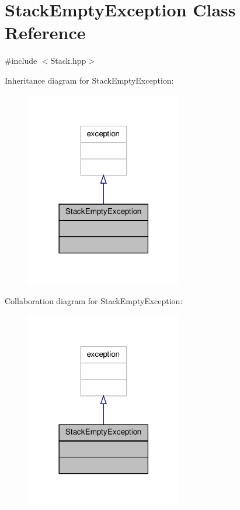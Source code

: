 \hypertarget{class_stack_empty_exception}{\section{Stack\-Empty\-Exception Class Reference}
\label{class_stack_empty_exception}
}


{\ttfamily \#include $<$Stack.\-hpp$>$}



Inheritance diagram for Stack\-Empty\-Exception\-:
\nopagebreak
\begin{figure}[H]
\begin{center}
\leavevmode
\includegraphics[width=194pt]{class_stack_empty_exception__inherit__graph}
\end{center}
\end{figure}


Collaboration diagram for Stack\-Empty\-Exception\-:
\nopagebreak
\begin{figure}[H]
\begin{center}
\leavevmode
\includegraphics[width=194pt]{class_stack_empty_exception__coll__graph}
\end{center}
\end{figure}


